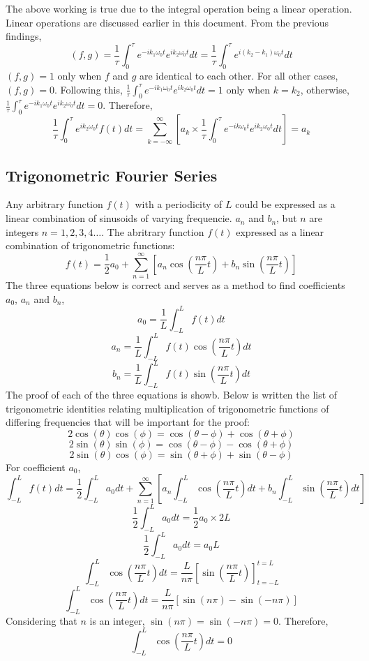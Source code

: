 \documentclass[a4paper, 12pt]{report}
\def\t{\theta}
\def\w{\omega}
\def\f{\frac}
\def\l{\left}
\def\r{\right}
\def\dst{\displaystyle}
\def\ph{\phi}
\begin{document}
\begin{center}
The above working is true due to the integral operation being a linear operation. Linear operations are discussed earlier in this document. From the previous findings,
$$(f,g) = \f{1}{\tau}\int^{\tau}_{0}e^{-ik_1\w_0t} e^{ik_2\w_0t}dt = \f{1}{\tau}\int^{\tau}_{0}e^{i(k_2-k_1)\w_0t}dt$$
$(f,g) = 1$ only when $f$ and $g$ are identical to each other. For all other cases, $(f,g) = 0$. Following this, $\dst{\f{1}{\tau}\int^{\tau}_{0}e^{-ik_1\w_0t} e^{ik_2\w_0t}dt} = 1$ only when $k = k_2$, otherwise, $\dst{\f{1}{\tau}\int^{\tau}_{0}e^{-ik_1\w_0t} e^{ik_2\w_0t}dt} = 0$. Therefore,
$$\f{1}{\tau}\int^{\tau}_{0}e^{ik_2\w_0t}f(t)dt = \sum^{\infty}_{k = -\infty}\l[a_k\times\f{1}{\tau}\int^{\tau}_{0}e^{-ik\w_0t}e^{ik_2\w_0t}dt\r] = a_k$$
\subsection{Trigonometric Fourier Series}
Any arbitrary function $f(t)$ with a periodicity of $L$ could be expressed as a linear combination of sinusoids of varying frequencie. $a_n$ and $b_n$, but $n$ are integers $n = 1,2,3,4\dots$. The abritrary function $f(t)$ expressed as a linear combination of trigonometric functions:
$$f(t) = \f{1}{2}a_0 + \sum_{n = 1}^{\infty}\l[a_n \cos\l(\f{n\pi}{L}t\r) + b_n \sin\l(\f{n\pi}{L}t\r)\r]$$
The three equations below is correct and serves as a method to find coefficients $a_0$, $a_n$ and $b_n$,
$$a_0 = \f{1}{L}\int_{-L}^{L}f(t)dt$$
$$a_n = \f{1}{L}\int_{-L}^{L}f(t)\cos\l(\f{n\pi}{L}t\r)dt$$
$$b_n = \f{1}{L}\int_{-L}^{L}f(t)\sin\l(\f{n\pi}{L}t\r)dt$$
The proof of each of the three equations is showb. Below is written the list of trigonometric identities relating multiplication of trigonometric functions of differing frequencies that will be important for the proof:
$$2\cos(\t)\cos(\ph) = \cos(\t - \ph) + \cos(\t + \ph)$$ 
$$2\sin(\t)\sin(\ph) = \cos(\t - \ph) - \cos(\t + \ph)$$
$$2\sin(\t)\cos(\ph) = \sin(\t + \ph) + \sin(\t - \ph)$$
For coefficient $a_0$,
$$\int_{-L}^{L}f(t)dt = \f{1}{2} \int_{-L}^{L}a_0dt + \sum_{n = 1}^{\infty}\l[a_n \int_{-L}^{L}\cos\l(\f{n\pi}{L}t\r)dt + b_n \int_{-L}^{L}\sin\l(\f{n\pi}{L}t\r)dt\r]$$
$$\f{1}{2} \int_{-L}^{L}a_0dt = \f{1}{2}a_0\times2L$$
$$\f{1}{2} \int_{-L}^{L}a_0dt = a_0L$$
$$\int_{-L}^{L}\cos\l(\f{n\pi}{L}t\r)dt = \f{L}{n\pi}\l[\sin\l(\f{n\pi}{L}t\r)\r]^{t = L}_{t = -L}$$
$$\int_{-L}^{L}\cos\l(\f{n\pi}{L}t\r)dt = \f{L}{n\pi}\l[\sin\l(n\pi\r) - \sin\l(-n\pi\r)\r]$$
Considering that $n$ is an integer, $\sin\l(n\pi\r) = \sin\l(-n\pi\r) = 0$. Therefore, 
$$\int_{-L}^{L}\cos\l(\f{n\pi}{L}t\r)dt = 0$$

\end{center}
\end{document}
